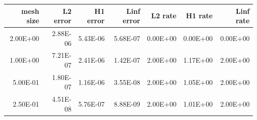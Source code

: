 \begin{tabular}{rrrrrrr}
\toprule
mesh size & L2 error & H1 error & Linf error & L2 rate & H1 rate & Linf rate \\
\midrule
2.00E+00 & 2.88E-06 & 5.43E-06 & 5.68E-07 & 0.00E+00 & 0.00E+00 & 0.00E+00 \\
1.00E+00 & 7.21E-07 & 2.41E-06 & 1.42E-07 & 2.00E+00 & 1.17E+00 & 2.00E+00 \\
5.00E-01 & 1.80E-07 & 1.16E-06 & 3.55E-08 & 2.00E+00 & 1.05E+00 & 2.00E+00 \\
2.50E-01 & 4.51E-08 & 5.76E-07 & 8.88E-09 & 2.00E+00 & 1.01E+00 & 2.00E+00 \\
\bottomrule
\end{tabular}

